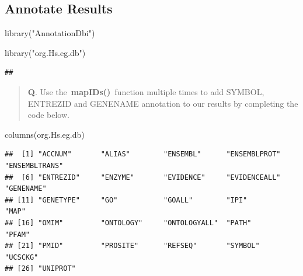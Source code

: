 \documentclass[
]{article}
\newenvironment{Shaded}{\begin{snugshade}}{\end{snugshade}}
\newcommand{\AttributeTok}[1]{\textcolor[rgb]{0.77,0.63,0.00}{#1}}
\newcommand{\FunctionTok}[1]{\textcolor[rgb]{0.00,0.00,0.00}{#1}}
\newcommand{\NormalTok}[1]{#1}
\newcommand{\OtherTok}[1]{\textcolor[rgb]{0.56,0.35,0.01}{#1}}
\newcommand{\SpecialCharTok}[1]{\textcolor[rgb]{0.00,0.00,0.00}{#1}}
\newcommand{\StringTok}[1]{\textcolor[rgb]{0.31,0.60,0.02}{#1}}
\begin{document}
\hypertarget{annotate-results}{%
\subsection{Annotate Results}\label{annotate-results}}

\begin{Shaded}
\begin{Highlighting}[]
\FunctionTok{library}\NormalTok{(}\StringTok{"AnnotationDbi"}\NormalTok{)}
\end{Highlighting}
\end{Shaded}

\begin{Shaded}
\begin{Highlighting}[]
\FunctionTok{library}\NormalTok{(}\StringTok{"org.Hs.eg.db"}\NormalTok{)}
\end{Highlighting}
\end{Shaded}

\begin{verbatim}
## 
\end{verbatim}

\begin{quote}
\textbf{Q}. Use the~\textbf{mapIDs()}~function multiple times to add
SYMBOL, ENTREZID and GENENAME annotation to our results by completing
the code below.
\end{quote}

\begin{Shaded}
\begin{Highlighting}[]
\FunctionTok{columns}\NormalTok{(org.Hs.eg.db)}
\end{Highlighting}
\end{Shaded}

\begin{verbatim}
##  [1] "ACCNUM"       "ALIAS"        "ENSEMBL"      "ENSEMBLPROT"  "ENSEMBLTRANS"
##  [6] "ENTREZID"     "ENZYME"       "EVIDENCE"     "EVIDENCEALL"  "GENENAME"    
## [11] "GENETYPE"     "GO"           "GOALL"        "IPI"          "MAP"         
## [16] "OMIM"         "ONTOLOGY"     "ONTOLOGYALL"  "PATH"         "PFAM"        
## [21] "PMID"         "PROSITE"      "REFSEQ"       "SYMBOL"       "UCSCKG"      
## [26] "UNIPROT"
\end{verbatim}

\begin{Shaded}
\end{Shaded}
\end{document}
